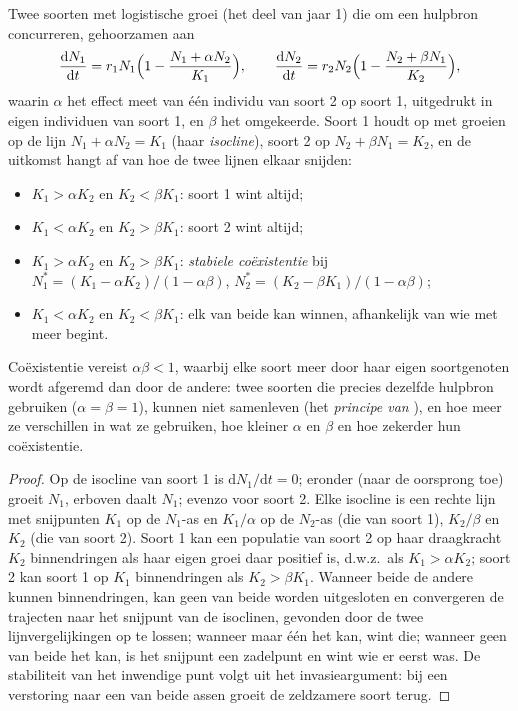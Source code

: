\begin{theorem}\label{thm:b2:speciation:lv}
Twee soorten met logistische groei (het deel van jaar 1) die om een
hulpbron concurreren, gehoorzamen aan
\[
\frac{\mathrm{d}N_1}{\mathrm{d}t} = r_1 N_1\Bigl(1 - \frac{N_1 + \alpha N_2}{K_1}\Bigr), \qquad
\frac{\mathrm{d}N_2}{\mathrm{d}t} = r_2 N_2\Bigl(1 - \frac{N_2 + \beta N_1}{K_2}\Bigr),
\]
waarin $\alpha$ het effect meet van één individu van soort 2
op soort 1, uitgedrukt in eigen individuen van soort 1, en $\beta$
het omgekeerde. Soort 1 houdt op met groeien op de lijn $N_1 + \alpha N_2 =
K_1$ (haar \emph{isocline}), soort 2 op $N_2 + \beta N_1 = K_2$, en
de uitkomst hangt af van hoe de twee lijnen elkaar snijden:
\begin{itemize}
  \item $K_1 > \alpha K_2$ en $K_2 < \beta K_1$: soort 1 wint
        altijd;
  \item $K_1 < \alpha K_2$ en $K_2 > \beta K_1$: soort 2 wint
        altijd;
  \item $K_1 > \alpha K_2$ en $K_2 > \beta K_1$: \emph{stabiele
        coëxistentie} bij $N_1^{*} = (K_1 - \alpha K_2)/(1 - \alpha\beta)$,
        $N_2^{*} = (K_2 - \beta K_1)/(1 - \alpha\beta)$;
  \item $K_1 < \alpha K_2$ en $K_2 < \beta K_1$: elk van beide kan winnen,
        afhankelijk van wie met meer begint.
\end{itemize}
Coëxistentie vereist $\alpha\beta < 1$, waarbij elke soort meer door haar
eigen soortgenoten wordt afgeremd dan door de andere: twee soorten die precies
dezelfde hulpbron gebruiken ($\alpha = \beta = 1$), kunnen niet samenleven
(het \emph{principe van }), en hoe meer ze verschillen
in wat ze gebruiken, hoe kleiner $\alpha$ en $\beta$ en hoe zekerder hun
coëxistentie.
\end{theorem}
\begin{proof}
Op de isocline van soort 1 is $\mathrm{d}N_1/\mathrm{d}t = 0$; eronder
(naar de oorsprong toe) groeit $N_1$, erboven daalt $N_1$; evenzo voor
soort 2. Elke isocline is een rechte lijn met snijpunten $K_1$
op de $N_1$-as en $K_1/\alpha$ op de $N_2$-as (die van soort 1),
$K_2/\beta$ en $K_2$ (die van soort 2). Soort 1 kan een
populatie van soort 2 op haar draagkracht $K_2$ binnendringen als haar eigen
groei daar positief is, d.w.z.\ als $K_1 > \alpha K_2$; soort 2 kan
soort 1 op $K_1$ binnendringen als $K_2 > \beta K_1$. Wanneer beide de
andere kunnen binnendringen, kan geen van beide worden uitgesloten en
convergeren de trajecten naar het snijpunt van de isoclinen, gevonden door de
twee lijnvergelijkingen op te lossen; wanneer maar één het kan, wint die;
wanneer geen van beide het kan, is het snijpunt een zadelpunt en wint wie er
eerst was. De stabiliteit van het inwendige punt volgt uit het
invasieargument: bij een verstoring naar een van beide assen groeit de
zeldzamere soort terug.
\end{proof}

